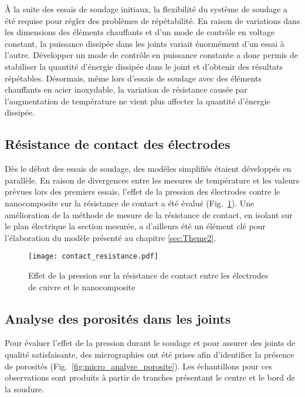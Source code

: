 À la suite des essais de soudage initiaux, la flexibilité du système de soudage a été requise pour régler des problèmes de répétabilité. 
En raison de variations dans les dimensions des éléments chauffants et d'un mode de contrôle en voltage constant, la puissance dissipée dans les joints variait énormément d'un essai à l'autre. 
Développer un mode de contrôle en puissance constante a donc permis de stabiliser la quantité d'énergie dissipée dans le joint et d'obtenir des résultats répétables. 
Désormais, même lors d'essais de soudage avec des éléments chauffants en acier inoxydable, la variation de résistance causée par l'augmentation de température ne vient plus affecter la quantité d'énergie dissipée. 

\FloatBarrier
\subsection{Résistance de contact des électrodes}

Dès le début des essais de soudage, des modèles simplifiés étaient développés en parallèle. 
En raison de divergences entre les mesures de température et les valeurs prévues lors des premiers essais, l'effet de la pression des électrodes contre le nanocomposite sur la résistance de contact a été évalué (Fig.~\ref{fig:resistance_contact}). 
Une amélioration de la méthode de mesure de la résistance de contact, en isolant sur le plan électrique la section mesurée, a d'ailleurs été un élément clé pour l'élaboration du modèle présenté au chapitre \ref{sec:Theme2}. 

\begin{figure}[h]
	\centering
	\texttt{[image: contact\_resistance.pdf]}
	\caption{Effet de la pression sur la résistance de contact entre les électrodes de cuivre et le nanocomposite}
	\label{fig:resistance_contact}
\end{figure}

\FloatBarrier
\subsection{Analyse des porosités dans les joints}

Pour évaluer l'effet de la pression durant le soudage et pour assurer des joints de qualité satisfaisante, des micrographies ont été prises afin d'identifier la présence de porosités (Fig.~\ref{fig:micro_analyse_porosite}). 
Les échantillons pour ces observations sont produits à partir de tranches présentant le centre et le bord de la soudure. 

